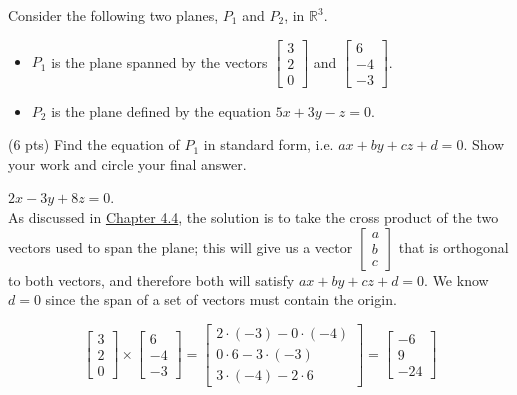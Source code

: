 \documentclass[11pt]{article}
\begin{document}
\begin{prob}[(12 pts)]
Consider the following two planes, $P_1$ and $P_2$, in $\mathbb{R}^3$.
\begin{itemize}
    \item $P_1$ is the plane spanned by the vectors $\begin{bmatrix} 3 \\ 2 \\ 0 \end{bmatrix}$ and $\begin{bmatrix} 6 \\ -4 \\ -3 \end{bmatrix}$.
    \item $P_2$ is the plane defined by the equation $5x + 3y - z = 0$.
\end{itemize}
\begin{subprob}(6 pts)
Find the equation of $P_1$ in standard form, i.e. $ax + by + cz + d = 0$. Show your work and $\boxed{\text{circle}}$ your final answer. \\

\emptybox{6cm}

\begin{solution}$2x - 3y + 8z = 0$. \\

As discussed in \href{https://notes.eecs245.org/linear-independence/lines-planes-hyperplanes/}{Chapter 4.4}, the solution is to take the cross product of the two vectors used to span the plane; this will give us a vector $\begin{bmatrix} a \\ b \\ c \end{bmatrix}$ that is orthogonal to both vectors, and therefore both will satisfy $ax + by + cz + d = 0$. We know $d = 0$ since the span of a set of vectors must contain the origin.

$$\begin{bmatrix} 3 \\ 2 \\ 0 \end{bmatrix} \times \begin{bmatrix} 6 \\ -4 \\ -3 \end{bmatrix} = \begin{bmatrix} 2 \cdot (-3) - 0 \cdot (-4) \\ 0 \cdot 6 - 3 \cdot (-3) \\ 3 \cdot (-4) - 2 \cdot 6 \end{bmatrix} = \begin{bmatrix} -6 \\ 9 \\ -24 \end{bmatrix}$$


\end{solution}
\end{subprob}
\end{prob}
\end{document}

